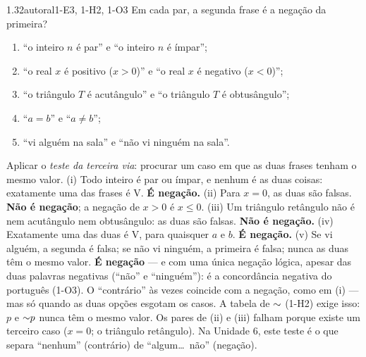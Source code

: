 \begin{exemplo}{1.3}{2}{autoral}{1-E3, 1-H2, 1-O3}\label{ex:1.3}
Em cada par, a segunda frase é a negação da primeira?
\begin{enumerate}[label=(\roman*)]
  \item \enquote{o inteiro $n$ é par} \quad e \quad \enquote{o inteiro $n$ é ímpar};
  \item \enquote{o real $x$ é positivo ($x>0$)} \quad e \quad \enquote{o real $x$ é negativo ($x<0$)};
  \item \enquote{o triângulo $T$ é acutângulo} \quad e \quad \enquote{o triângulo $T$ é obtusângulo};
  \item \enquote{$a=b$} \quad e \quad \enquote{$a\neq b$};
  \item \enquote{vi alguém na sala} \quad e \quad \enquote{não vi ninguém na sala}.
\end{enumerate}
\plano Aplicar o \emph{teste da terceira via}: procurar um caso em que as duas frases tenham o mesmo valor.
\resolucao
(i) Todo inteiro é par ou ímpar, e nenhum é as duas coisas: exatamente uma das frases é V. \textbf{É negação.}
(ii) Para $x=0$, as duas são falsas. \textbf{Não é negação}; a negação de $x>0$ é $x\le 0$.
(iii) Um triângulo retângulo não é nem acutângulo nem obtusângulo: as duas são falsas. \textbf{Não é negação.}
(iv) Exatamente uma das duas é V, para quaisquer $a$ e $b$. \textbf{É negação.}
(v) Se vi alguém, a segunda é falsa; se não vi ninguém, a primeira é falsa; nunca as duas têm o mesmo valor. \textbf{É negação} — e com uma única negação lógica, apesar das duas palavras negativas (\enquote{não} e \enquote{ninguém}): é a concordância negativa do português (1-O3).
\comentario O \enquote{contrário} às vezes coincide com a negação, como em (i) — mas só quando as duas opções esgotam os casos. A tabela de ${\sim}$ (1-H2) exige isso: $p$ e ${\sim} p$ nunca têm o mesmo valor. Os pares de (ii) e (iii) falham porque existe um terceiro caso ($x=0$; o triângulo retângulo). Na Unidade 6, este teste é o que separa \enquote{nenhum} (contrário) de \enquote{algum\ldots\ não} (negação).
\end{exemplo}

